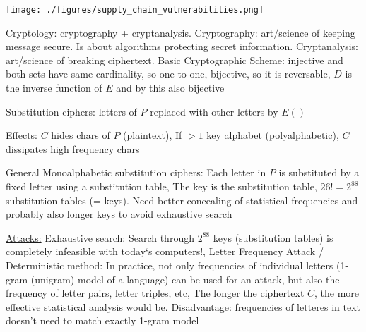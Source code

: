 \documentclass[landscape, a4paper]{article}
\begin{document}
\begin{minipage}[t]{0.2\linewidth}
\begin{betterlist}
	\end{betterlist}
	\texttt{[image: ./figures/supply\_chain\_vulnerabilities.png]}
	\begin{betterlist}
		\item \alert{Cryptology:} cryptography + cryptanalysis. \alert{Cryptography:} art/science of keeping message secure. Is about algorithms protecting secret information. \alert{Cryptanalysis:} art/science of breaking ciphertext. \alert{Basic Cryptographic Scheme:} \alert{injective} and both sets have \alert{same cardinality}, so \alert{one-to-one}, \alert{bijective}, so it is \alert{reversable}, $D$ is the \alert{inverse function} of $E$ and by this also bijective
	\end{betterlist}
	\begin{betterlist}
		\item \alert{Substitution ciphers:} letters of $P$ replaced with other letters by $E()$
		\begin{betterlist}
			\item \underline{Effects:} $C$ hides chars of $P$ (plaintext), If $> 1$ key alphabet (polyalphabetic), $C$ dissipates high frequency chars
		\end{betterlist}
		\begin{betterlist}
			\item \alert{General Monoalphabetic substitution ciphers:} Each letter in $P$ is substituted by a fixed letter using a \alert{substitution table}, The \alert{key} is the substitution table, $26!=2^{88}$ substitution tables (= keys). Need better concealing of statistical frequencies and probably also longer keys to avoid exhaustive search
			\begin{betterlist}
				\item \underline{Attacks:} \sout{Exhaustive search:} Search through $2^{88}$ keys (substitution tables) is completely infeasible with today‘s computers!, \alert{Letter Frequency Attack / Deterministic method:} In practice, not only frequencies of individual letters (\alert{1-gram} (unigram) model of a language) can be used for an attack, but also the frequency of letter pairs, letter triples, etc, The longer the ciphertext $C$, the more effective statistical analysis would be. \underline{Disadvantage:} frequencies of letteres in text doesn't need to match exactly 1-gram model

\end{betterlist}
\end{betterlist}
\end{betterlist}
\end{minipage}
\end{document}
